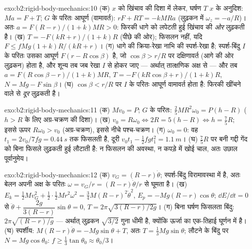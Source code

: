 \begin{solution}{exo:b2:rigid-body-mechanics:10}
(क) $x$ को खिंचाव की दिशा में लेकर, घर्षण $T$ $x$ के अनुदिश: $Ma = F + T$;
$G$ के परितः आघूर्ण (वामावर्त): $rF + RT = -kMRa$ (लुढ़कन में
$\omega_z
= -a/R$)। अतः $a = F(R - r)/(1 + k)MR > 0$: फिरकी धागे को लपेटती
हुई
खिंचाव की \emph{ओर} लुढ़कती है। (ख) $T = -F(kR + r)/(1 +
k)R$ (पीछे की ओर);
फिसलन नहीं, यदि $F \le fMg(1 + k)R/(kR + r)$। (ग) धागे की
क्रिया-रेखा नाभि की स्पर्श-रेखा है; स्पर्श-बिंदु $I$ के परितः
उसका आघूर्ण $F(r - R\cos\beta)$ है, जो $\cos\beta >
r/R$ पर दक्षिणावर्त (आगे
की ओर लुढ़कन) होता है, और शून्य तब जब रेखा $I$
से होकर जाए --- अर्थात् तात्क्षणिक अक्ष से
--- और तब $a = F(R\cos\beta - r)/(1 + k)MR$, $T = -F(kR\cos\beta + r)/(1 + k)R$,
$N = Mg - F\sin\beta$। (घ) $\cos\beta < r/R$ पर $I$ के परितः आघूर्ण
वामावर्त होता है: फिरकी खींचने वाले से \emph{दूर} लुढ़कती है।
\end{solution}

\begin{solution}{exo:b2:rigid-body-mechanics:11}
(क) $Mv_0 = P$; $G$ के परितः: $\tfrac25MR^2\omega_0 = P(h - R)$ ($h > R$ के लिए
अग्र-चक्रण की दिशा)। (ख)
$v_0 = R\omega_0 \iff 2R = 5(h - R) \iff h = \tfrac75R$; इससे
ऊपर $R\omega_0 > v_0$ (अग्र-चक्रण), इससे नीचे पश्च-चक्रण। (ग)
$\omega_0 = 0$: वह $t_1 = 2v_0/7fg = \qty{0.44}{s}$ तक फिसलती है, दूरी
$v_0t_1 -
\tfrac12fgt_1^2 = \qty{1.1}{m}$। (घ) $\tfrac75R$ पर बनी गद्दी गेंद
को बिना
फिसले लुढ़कती हुई लौटाती है: न फिसलन की अवस्था, न कपड़े में खोई चाल,
अतः उछाल पूर्वानुमेय।
\end{solution}

\begin{solution}{exo:b2:rigid-body-mechanics:12}
(क) $v_G = (R - r)\dot\theta$; स्पर्श-बिंदु विरामावस्था में है, अतः
बेलन अपनी अक्ष के परितः $\omega = v_G/r = (R - r)\dot\theta/r$ से घूमता है।
(ख)
$E_k = \tfrac12Mv_G^2 + \tfrac12\cdot\tfrac12Mr^2\omega^2 = \tfrac34M(R - r)^2
\dot\theta^2$,
$E_p = -Mg(R - r)\cos\theta$; $\dd E/\dd t = 0$ से
$\ddot\theta
+ \dfrac{2g}{3(R - r)}\sin\theta = 0$,
$T = 2\pi\sqrt{3(R - r)/2g}$। (ग)
बिना घर्षण फिसलता बिंदु: $2\pi\sqrt{(R - r)/g}$ --- अर्थात् लुढ़कन
$\sqrt{3/2}$ गुना धीमी है,
क्योंकि ऊर्जा का एक-तिहाई घूर्णन में है। (घ) स्पर्शीय:
$M(R - r)\ddot\theta =
-Mg\sin\theta + T$, अतः $T = \tfrac13Mg\sin\theta$;
लौटने के बिंदु पर
$N = Mg\cos\theta_0$: $f \ge \tfrac13\tan\theta_0 \approx \theta_0/3$।
\end{solution}

